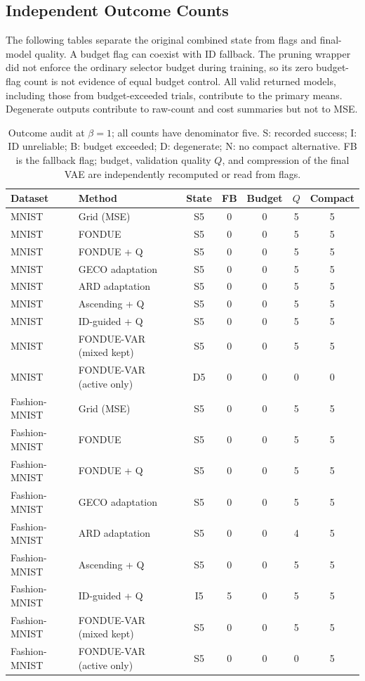 \documentclass[make,article,submit,pdftex,moreauthors]{Definitions/mdpi}
\begin{document}
\subsection{Independent Outcome Counts}\label{app:outcomes}
The following tables separate the original combined state from flags and
final-model quality. A budget flag can coexist with ID fallback. The
pruning wrapper did not enforce the ordinary selector budget during
training, so its zero budget-flag count is not evidence of equal budget
control. All valid returned models, including those from budget-exceeded
trials, contribute to the primary means. Degenerate outputs contribute
to raw-count and cost summaries but not to MSE.
\begin{table}[H]
\caption{Outcome audit at $\beta=1$; all counts have denominator five. S: recorded success; I: ID unreliable; B: budget exceeded; D: degenerate; N: no compact alternative. FB is the fallback flag; budget, validation quality $Q$, and compression of the final VAE are independently recomputed or read from flags.}\label{tab:outcomes0}
\footnotesize
\setlength{\tabcolsep}{3.5pt}
\begin{tabular*}{\textwidth}{@{\extracolsep{\fill}}llccccc@{}}
\toprule
Dataset & Method & State & FB & Budget & $Q$ & Compact \\
\midrule
MNIST & Grid (MSE) & S5 & 0 & 0 & 5 & 5 \\
MNIST & FONDUE & S5 & 0 & 0 & 5 & 5 \\
MNIST & FONDUE + Q & S5 & 0 & 0 & 5 & 5 \\
MNIST & GECO adaptation & S5 & 0 & 0 & 5 & 5 \\
MNIST & ARD adaptation & S5 & 0 & 0 & 5 & 5 \\
MNIST & Ascending + Q & S5 & 0 & 0 & 5 & 5 \\
MNIST & ID-guided + Q & S5 & 0 & 0 & 5 & 5 \\
MNIST & FONDUE-VAR (mixed kept) & S5 & 0 & 0 & 5 & 5 \\
MNIST & FONDUE-VAR (active only) & D5 & 0 & 0 & 0 & 0 \\
Fashion-MNIST & Grid (MSE) & S5 & 0 & 0 & 5 & 5 \\
Fashion-MNIST & FONDUE & S5 & 0 & 0 & 5 & 5 \\
Fashion-MNIST & FONDUE + Q & S5 & 0 & 0 & 5 & 5 \\
Fashion-MNIST & GECO adaptation & S5 & 0 & 0 & 5 & 5 \\
Fashion-MNIST & ARD adaptation & S5 & 0 & 0 & 4 & 5 \\
Fashion-MNIST & Ascending + Q & S5 & 0 & 0 & 5 & 5 \\
Fashion-MNIST & ID-guided + Q & I5 & 5 & 0 & 5 & 5 \\
Fashion-MNIST & FONDUE-VAR (mixed kept) & S5 & 0 & 0 & 5 & 5 \\
Fashion-MNIST & FONDUE-VAR (active only) & S5 & 0 & 0 & 0 & 5 \\
\bottomrule
\end{tabular*}
\end{table}
\end{document}
